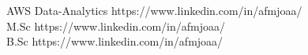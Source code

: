 
\horizontalLineLeft

\certificateItem
    {AWS Data-Analytics}
    {https://www.linkedin.com/in/afmjoaa/} \\
\certificateItem
    {M.Sc}
    {https://www.linkedin.com/in/afmjoaa/} \\
\certificateItem
    {B.Sc}
    {https://www.linkedin.com/in/afmjoaa/}
